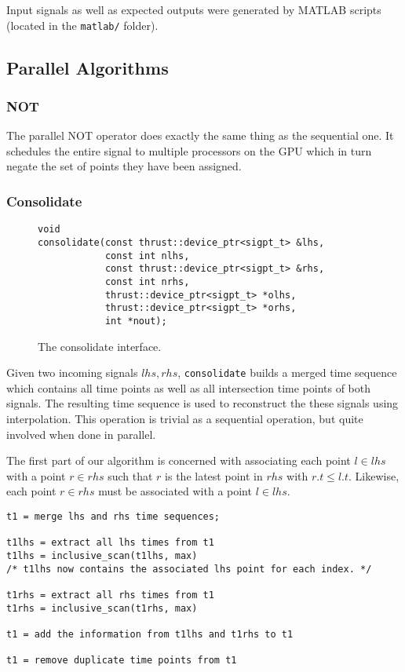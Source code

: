 \documentclass[a4paper,10pt]{article}
\begin{document}
Input signals as well as expected outputs were generated by MATLAB scripts (located
in the \verb|matlab/| folder).

\subsection{Parallel Algorithms}

\subsubsection{NOT}

The parallel NOT operator does exactly the same thing as the sequential one. It
schedules the entire signal to multiple processors on the GPU which in turn negate
the set of points they have been assigned.

\subsubsection{Consolidate}

\begin{figure}[H]
\begin{lstlisting}
void
consolidate(const thrust::device_ptr<sigpt_t> &lhs,
            const int nlhs,
            const thrust::device_ptr<sigpt_t> &rhs,
            const int nrhs,
            thrust::device_ptr<sigpt_t> *olhs,
            thrust::device_ptr<sigpt_t> *orhs,
            int *nout);
\end{lstlisting}
\caption{
\label{fig:parallel_consolidate}
The consolidate interface.}
\end{figure}

Given two incoming signals $lhs, rhs$, \lstinline|consolidate| builds a
merged time sequence which contains all time points as well as all intersection
time points of both signals. The resulting time sequence is used to reconstruct
the these signals using interpolation. This operation is trivial as a sequential
operation, but quite involved when done in parallel.

The first part of our algorithm is concerned with associating each point $l \in lhs$
with a point $r \in rhs$ such that $r$ is the latest point in $rhs$ with $r.t \leq l.t$. Likewise, each point $r \in rhs$ must be associated with a point $l \in lhs$.

\begin{lstlisting}
t1 = merge lhs and rhs time sequences;

t1lhs = extract all lhs times from t1
t1lhs = inclusive_scan(t1lhs, max)
/* t1lhs now contains the associated lhs point for each index. */

t1rhs = extract all rhs times from t1
t1rhs = inclusive_scan(t1rhs, max)

t1 = add the information from t1lhs and t1rhs to t1

t1 = remove duplicate time points from t1
\end{lstlisting}
\end{document}
